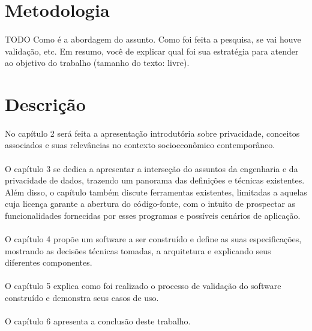 \section{Metodologia}

\paragraph{} TODO Como é a abordagem do assunto. Como foi feita a pesquisa, se vai houve validação, etc. Em resumo, você de explicar qual foi sua estratégia para atender ao objetivo do trabalho (tamanho do texto: livre).


\section{Descrição}

\paragraph{}No capítulo 2 será feita a apresentação introdutória sobre privacidade, conceitos associados e suas relevâncias no contexto socioeconômico contemporâneo.

\paragraph{}O capítulo 3 se dedica a apresentar a interseção do assuntos da engenharia e da privacidade de dados, trazendo um panorama das definições e técnicas existentes. Além disso, o capítulo também discute ferramentas existentes, limitadas a aquelas cuja licença garante a abertura do código-fonte, com o intuito de prospectar as funcionalidades fornecidas por esses programas e possíveis cenários de aplicação.

\paragraph{}O capítulo 4 propõe um software a ser construído e define as suas especificações, mostrando as decisões técnicas tomadas, a arquitetura e explicando seus diferentes componentes.

\paragraph{}O capítulo 5 explica como foi realizado o processo de validação do software construído e demonstra seus casos de uso.

\paragraph{}O capítulo 6 apresenta a conclusão deste trabalho.
